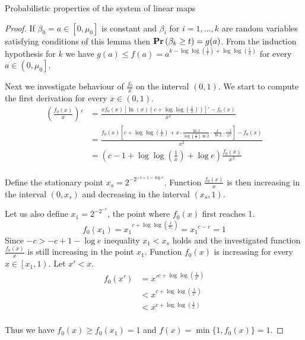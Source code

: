 \begin{section}{Probabilistic properties of the system of linear maps}
\begin{proof}
If $\beta_0 = a \in \left[0, \mu_0 \right]$ is constant and $\beta_i$ for $i = 1, \dots, k$ are random variables satisfying conditions of this lemma then $\mathbf{Pr}\left(\beta_k \geq t\right) = g(a)$. From the induction hypothesis for $k$ we have $g(a) \leq f(a) = a^{k - \log \log \left(\frac{1}{t}\right) + \log \log \left(\frac{1}{a}\right)}$ for every $a \in \left(0, \mu_0 \right]$.

Next we investigate behaviour of $\frac{f_0}{x}$ on the interval $(0, 1)$. We start to compute the first derivation for every $x \in (0, 1)$.
\[
\begin{split}
\left(\frac{f_0(x)}{x}\right)' 
	& = \frac{xf_0(x)\left[\ln(x)\left(c + \log \log \left(\frac{1}{x}\right)\right)\right]' - f_0(x)}{x^2} \\
	& = \frac{f_0(x)\left[c + \log \log \left(\frac{1}{x}\right) + x \cdot \frac{\ln x}{\log\left(\frac{1}{x}\right) \ln 2}\cdot\frac{x}{\ln 2}\cdot\frac{-1}{x ^ 2} \right] - f_0(x)}{x^2} \\
	& = \left(c - 1 + \log \log \left( \frac{1}{x} \right) + \log e \right)\frac{f_0(x)}{x^2} \\
\end{split}
\]

Define the stationary point $x_s = 2 ^ {-2 ^ {-c + 1 - \log e}}$. Function $\frac{f_0(x)}{x}$ is then increasing in the interval $(0, x_s)$ and decreasing in the interval $(x_s, 1)$. 

Let us also define $x_1 = 2 ^ {-2 ^ {-c}}$, the point where $f_0(x)$ first reaches 1.
\[
f_0(x_1) = {x_1} ^ {c + \log \log \left(\frac{1}{x_1}\right)} = {x_1} ^ {c - c} = 1
\]
Since $-c > -c + 1 -\log e$ inequality $x_1 < x_s$ holds and the investigated function $\frac{f_0(x)}{x}$ is still increasing in the point $x_1$.
Function $f_0(x)$ is increasing for every $x \in \left[x_1, 1\right)$. Let $x' < x$.
\[
\begin{split}
f_0(x') 
	& = {x'} ^ {c + \log \log \left(\frac{1}{x'}\right)} \\
	& < {x} ^ {c + \log \log \left(\frac{1}{x'}\right)} \\
	& < {x} ^ {c + \log \log \left(\frac{1}{x}\right)} \\
\end{split}
\]

Thus we have $f_0(x) \geq f_0(x_1) = 1$ and $f(x) = \min \{1, f_0(x)\} = 1$.


\end{proof}
\end{section}
